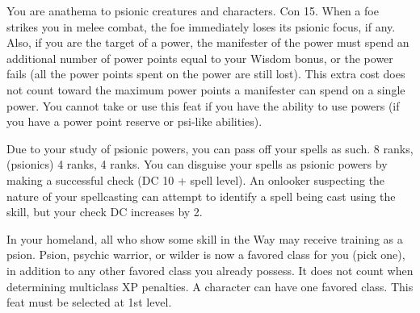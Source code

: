 {You are anathema to psionic creatures and characters.}
{Con 15.}
{When a foe strikes you in melee combat, the foe immediately loses its psionic focus, if any. Also, if you are the target of a power, the manifester of the power must spend an additional number of power points equal to your Wisdom bonus, or the power fails (all the power points spent on the power are still lost). This extra cost does not count toward the maximum power points a manifester can spend on a single power.}{}
{You cannot take or use this feat if you have the ability to use powers (if you have a power point reserve or psi-like abilities).}

{Due to your study of psionic powers, you can pass off your spells as such.}
{ 8 ranks,  (psionics) 4 ranks,  4 ranks.}
{You can disguise your spells as psionic powers by making a successful  check (DC 10 + spell level). An onlooker suspecting the nature of your spellcasting can attempt to identify a spell being cast using the  skill, but your check DC increases by 2.}{}{}

{In your homeland, all who show some skill in the Way may receive training as a psion.}{}
{Psion, psychic warrior, or wilder is now a favored class for you (pick one), in addition to any other favored class you already possess. It does not count when determining multiclass XP penalties.}
{A character can have one favored class.}
{This feat must be selected at 1st level.}



